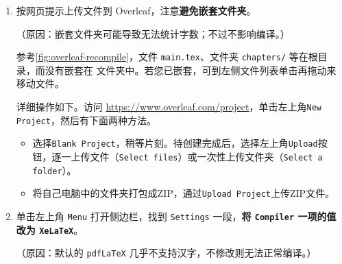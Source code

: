 \begin{enumerate}
  \item 按网页提示上传文件到 Overleaf，注意\textbf{避免嵌套文件夹}。

    （原因：嵌套文件夹可能导致无法统计字数；不过不影响编译。）

    参考\autoref{fig:overleaf-recompile}，文件 \texttt{main.tex}、文件夹 \texttt{chapters/} 等在根目录，而没有嵌套在  文件夹中。若您已嵌套，可到左侧文件列表单击再拖动来移动文件。

    详细操作如下。访问 \url{https://www.overleaf.com/project}，单击左上角\texttt{New Project}，然后有下面两种方法。

    \begin{itemize}
      \item 选择\texttt{Blank Project}，稍等片刻。待创建完成后，选择左上角\texttt{Upload}按钮，逐一上传文件（\texttt{Select files}）或一次性上传文件夹（\texttt{Select a folder}）。
      \item 将自己电脑中的文件夹打包成ZIP，通过\texttt{Upload Project}上传ZIP文件。
    \end{itemize}

  \item 单击左上角 \texttt{Menu} 打开侧边栏，找到 \texttt{Settings} 一段，\textbf{将 \texttt{Compiler} 一项的值改为 \texttt{XeLaTeX}}。

    （原因：默认的 \texttt{pdfLaTeX} 几乎不支持汉字，不修改则无法正常编译。）
\end{enumerate}
